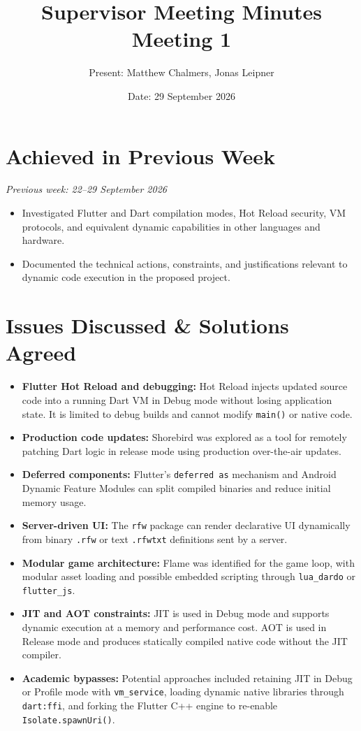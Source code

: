 \documentclass[12pt,a4paper]{article}
\title{\textbf{Supervisor Meeting Minutes}\\Meeting 1}
\author{Present: Matthew Chalmers, Jonas Leipner}
\date{Date: 29 September 2026}
\begin{document}
\maketitle

\section{Achieved in Previous Week}

\noindent\textit{Previous week: 22--29 September 2026}
\begin{itemize}[leftmargin=*]
    \item Investigated Flutter and Dart compilation modes, Hot Reload security, VM protocols, and equivalent dynamic capabilities in other languages and hardware.
    \item Documented the technical actions, constraints, and justifications relevant to dynamic code execution in the proposed project.
\end{itemize}

\section{Issues Discussed \& Solutions Agreed}

\begin{itemize}[leftmargin=*]
    \item \textbf{Flutter Hot Reload and debugging:} Hot Reload injects updated source code into a running Dart VM in Debug mode without losing application state. It is limited to debug builds and cannot modify \texttt{main()} or native code.
    \item \textbf{Production code updates:} Shorebird was explored as a tool for remotely patching Dart logic in release mode using production over-the-air updates.
    \item \textbf{Deferred components:} Flutter's \texttt{deferred as} mechanism and Android Dynamic Feature Modules can split compiled binaries and reduce initial memory usage.
    \item \textbf{Server-driven UI:} The \texttt{rfw} package can render declarative UI dynamically from binary \texttt{.rfw} or text \texttt{.rfwtxt} definitions sent by a server.
    \item \textbf{Modular game architecture:} Flame was identified for the game loop, with modular asset loading and possible embedded scripting through \texttt{lua\_dardo} or \texttt{flutter\_js}.
    \item \textbf{JIT and AOT constraints:} JIT is used in Debug mode and supports dynamic execution at a memory and performance cost. AOT is used in Release mode and produces statically compiled native code without the JIT compiler.
    \item \textbf{Academic bypasses:} Potential approaches included retaining JIT in Debug or Profile mode with \texttt{vm\_service}, loading dynamic native libraries through \texttt{dart:ffi}, and forking the Flutter C++ engine to re-enable \texttt{Isolate.spawnUri()}.
\end{itemize}
\end{document}
